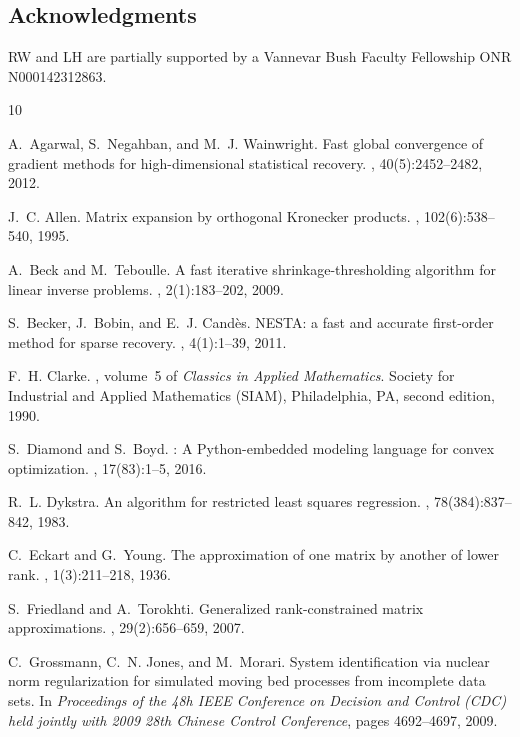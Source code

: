 \documentclass[11pt,reqno]{amsart}
\theoremstyle{definition}
\numberwithin{equation}{section}
\begin{document}
\subsection*{Acknowledgments} RW and LH are partially supported by a Vannevar Bush Faculty Fellowship ONR N000142312863. 


\begin{thebibliography}{10}

A.~Agarwal, S.~Negahban, and M.~J. Wainwright.
\newblock Fast global convergence of gradient methods for high-dimensional
  statistical recovery.
, 40(5):2452--2482, 2012.

J.~C. Allen.
\newblock Matrix expansion by orthogonal {K}ronecker products.
, 102(6):538--540, 1995.

A.~Beck and M.~Teboulle.
\newblock A fast iterative shrinkage-thresholding algorithm for linear inverse
  problems.
, 2(1):183--202, 2009.

S.~Becker, J.~Bobin, and E.~J. Cand\`es.
\newblock N{ESTA}: a fast and accurate first-order method for sparse recovery.
, 4(1):1--39, 2011.

F.~H. Clarke.
, volume~5 of {\em Classics
  in Applied Mathematics}.
\newblock Society for Industrial and Applied Mathematics (SIAM), Philadelphia,
  PA, second edition, 1990.

S.~Diamond and S.~Boyd.
: {A} {P}ython-embedded modeling language for convex
  optimization.
, 17(83):1--5, 2016.

R.~L. Dykstra.
\newblock An algorithm for restricted least squares regression.
, 78(384):837--842, 1983.

C.~Eckart and G.~Young.
\newblock The approximation of one matrix by another of lower rank.
, 1(3):211--218, 1936.

S.~Friedland and A.~Torokhti.
\newblock Generalized rank-constrained matrix approximations.
, 29(2):656--659, 2007.

C.~Grossmann, C.~N. Jones, and M.~Morari.
\newblock System identification via nuclear norm regularization for simulated
  moving bed processes from incomplete data sets.
\newblock In {\em Proceedings of the 48h IEEE Conference on Decision and
  Control (CDC) held jointly with 2009 28th Chinese Control Conference}, pages
  4692--4697, 2009.


\end{thebibliography}
\end{document}
